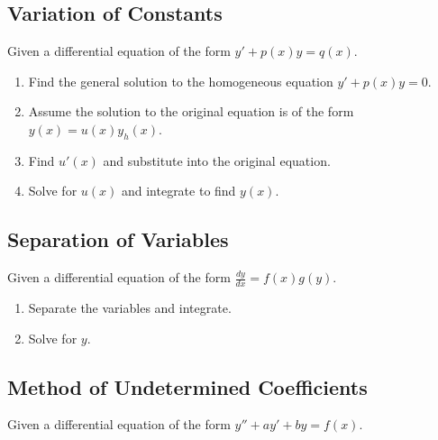 \documentclass[12pt]{article}
\begin{document}
\subsection*{Variation of Constants}

Given a differential equation of the form $y' + p(x)y = q(x)$.

\begin{enumerate}
  \item Find the general solution to the homogeneous equation $y' + p(x)y = 0$.
  \item Assume the solution to the original equation is of the form $y(x) = u(x) y_h(x)$.
  \item Find $u'(x)$ and substitute into the original equation.
  \item Solve for $u(x)$ and integrate to find $y(x)$.
\end{enumerate}

\subsection*{Separation of Variables}

Given a differential equation of the form $\frac{dy}{dx} = f(x)g(y)$.

\begin{enumerate}
  \item Separate the variables and integrate.
  \item Solve for $y$.
\end{enumerate}

\subsection*{Method of Undetermined Coefficients}

Given a differential equation of the form $y'' + ay' + by = f(x)$.
\end{document}
